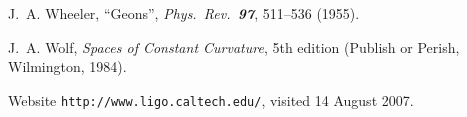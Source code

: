\documentclass{SMLreport}
\begin{document}
\begin{thebibliography}{99}
J.~A. Wheeler,
``Geons'',
{\it Phys.\ Rev.\ \bf 97}, 511--536
(1955).

J.~A. Wolf,
{\it Spaces of Constant Curvature\/},
5th edition
(Publish or Perish, Wilmington, 1984).


Website \texttt{http://www.ligo.caltech.edu/},
visited 14 August 2007.

\end{thebibliography}
\end{document}
